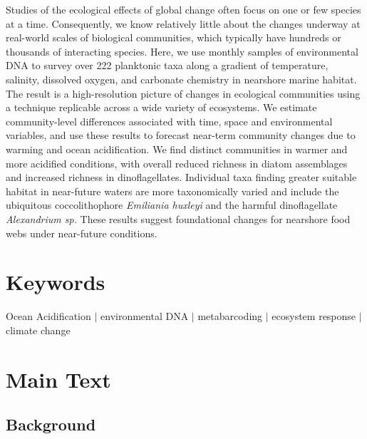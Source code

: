 \documentclass[11pt]{article}
\begin{document}
\begin{linenumbers}
Studies of the ecological effects of global change often focus on one or few species at a time. Consequently, we know relatively little about the changes underway at real-world scales of biological communities, which typically have hundreds or thousands of interacting species. Here, we use monthly samples of environmental DNA to survey over 222 planktonic taxa along a gradient of temperature, salinity, dissolved oxygen, and carbonate chemistry in nearshore marine habitat. The result is a high-resolution picture of changes in ecological communities using a technique replicable across a wide variety of ecosystems. We estimate community-level differences associated with time, space and environmental variables, and use these results to forecast near-term community changes due to warming and ocean acidification. We find distinct communities in warmer and more acidified conditions, with overall reduced richness in diatom assemblages and increased richness in dinoflagellates. Individual taxa finding greater suitable habitat in near-future waters are more taxonomically varied and include the ubiquitous coccolithophore \textit{Emiliania huxleyi} and the harmful dinoflagellate \textit{Alexandrium sp.} These results suggest foundational changes for nearshore food webs under near-future conditions.




\section{Keywords}
Ocean Acidification $|$ environmental DNA $|$ metabarcoding $|$ ecosystem response $|$ climate change

\section{Main Text}


\subsection{Background}




\end{linenumbers}
\end{document}
